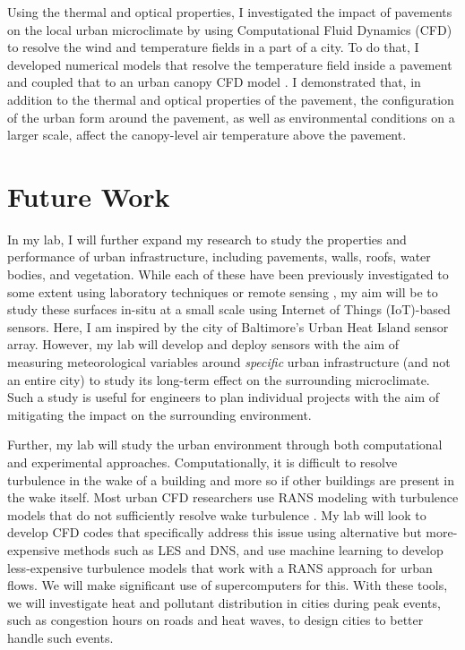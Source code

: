 \documentclass[12pt]{article}
\begin{document}
Using the thermal and optical properties, I investigated the impact of pavements on the local urban microclimate by using Computational Fluid Dynamics (CFD) to resolve the wind and temperature fields in a part of a city. To do that, I developed numerical models that resolve the temperature field inside a pavement \cite{sen2017microscale} and coupled that to an urban canopy CFD model \cite{sen2017uncoupled}. I demonstrated that, in addition to the thermal and optical properties of the pavement, the configuration of the urban form around the pavement, as well as environmental conditions on a larger scale, affect the canopy-level air temperature above the pavement. 

\section*{Future Work}
In my lab, I will further expand my research to study the properties and performance of urban infrastructure, including pavements, walls, roofs, water bodies, and vegetation. While each of these have been previously investigated to some extent using laboratory techniques or remote sensing \cite{berdahl1997preliminary, niachou2001analysis, sun2012can, gallo1993use}, my aim will be to study these surfaces in-situ at a small scale using Internet of Things (IoT)-based sensors. Here, I am inspired by the city of Baltimore's Urban Heat Island sensor array. However, my lab will develop and deploy sensors with the aim of measuring meteorological variables around \textit{specific} urban infrastructure (and not an entire city) to study its long-term effect on the surrounding microclimate. Such a study is useful for engineers to plan individual projects with the aim of mitigating the impact on the surrounding environment. 

Further, my lab will study the urban environment through both computational and experimental approaches. Computationally, it is difficult to resolve turbulence in the wake of a building and more so if other buildings are present in the wake itself. Most urban CFD researchers use RANS modeling with turbulence models that do not sufficiently resolve wake turbulence \cite{blocken2015computational}. My lab will look to develop CFD codes that specifically address this issue using alternative but more-expensive methods such as LES and DNS, and use machine learning to develop less-expensive turbulence models that work with a RANS approach for urban flows. We will make significant use of supercomputers for this. With these tools, we will investigate heat and pollutant distribution in cities during peak events, such as congestion hours on roads and heat waves, to design cities to better handle such events.
\end{document}
